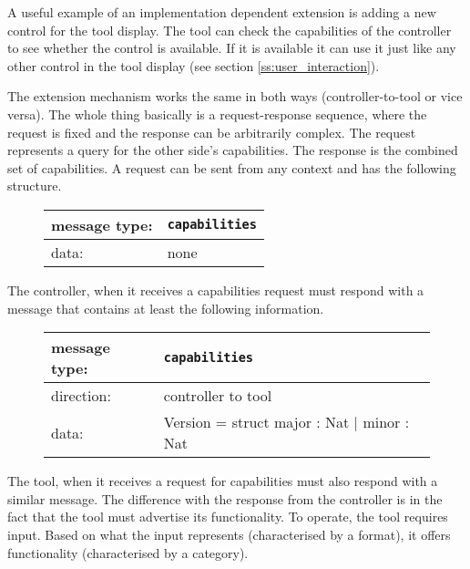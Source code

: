 \documentclass{article}
\newcommand{\msg}[1]{\texttt{#1}}
\begin{document}
   A useful example of an implementation dependent extension is adding a new
   control for the tool display. The tool can check the capabilities of the
   controller to see whether the control is available. If it is available it
   can use it just like any other control in the tool display (see section
   \ref{ss:user_interaction}).

   The extension mechanism works the same in both ways (controller-to-tool or
   vice versa). The whole thing basically is a request-response sequence,
   where the request is fixed and the response can be arbitrarily complex. The
   request represents a query for the other side's capabilities. The response
   is the combined set of capabilities. A request can be sent from any context
   and has the following structure.

   \begin{figure}[H]
    \begin{center}
     \begin{tabular}{|ll|}
      \hline
      message type:    & \msg{capabilities} \\
      \hline
      data:            & none \\
      \hline
     \end{tabular}
    \end{center}
   \end{figure}

   The controller, when it receives a capabilities request must respond with a
   message that contains at least the following information.

   \begin{figure}[H]
    \begin{center}
     \begin{tabular}{|ll|}
      \hline
       message type:   & \msg{capabilities} \\
      \hline
       direction:      & controller to tool \\
       data:           & Version = struct major : Nat $|$ minor : Nat \\
      \hline
     \end{tabular}
    \end{center}
   \end{figure}

   \noindent The tool, when it receives a request for capabilities must also respond with
   a similar message. The difference with the response from the controller is
   in the fact that the tool must advertise its functionality. To operate, the
   tool requires input. Based on what the input represents (characterised by a
   format), it offers functionality (characterised by a category).
   
\end{document}
